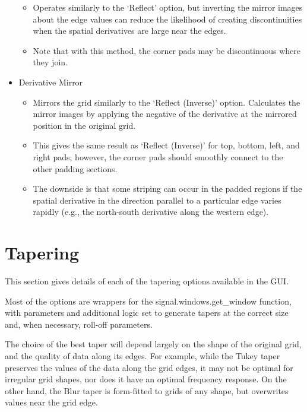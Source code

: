 \documentclass[letterpaper,10pt,english,openany,oneside]{sphinxmanual}
\begin{document}
\begin{itemize}
\begin{itemize}
\item {} 
Operates similarly to the ‘Reflect’ option, but inverting the mirror images about the edge values can reduce the likelihood of creating discontinuities when the spatial derivatives are large near the edges.

\item {} 
Note that with this method, the corner pads may be discontinuous where they join.

\end{itemize}

\item {} 
Derivative Mirror
\begin{itemize}
\item {} 
Mirrors the grid similarly to the ‘Reflect (Inverse)’ option. Calculates the mirror images by applying the negative of the derivative at the mirrored position in the original grid.

\item {} 
This gives the same result as ‘Reflect (Inverse)’ for top, bottom, left, and right pads; however, the corner pads should smoothly connect to the other padding sections.

\item {} 
The downside is that some striping can occur in the padded regions if the spatial derivative in the direction parallel to a particular edge varies rapidly (e.g., the north-south derivative along the western edge).

\end{itemize}

\end{itemize}


\section{Tapering}
\label{\detokenize{index:tapering}}\label{\detokenize{content/preprocessing/tapering:tapering}}
This section gives details of each of the tapering options available in the GUI.

Most of the options are wrappers for the signal.windows.get\_window function, with parameters and additional logic set to generate tapers at the correct size and, when necessary, roll-off parameters.

The choice of the best taper will depend largely on the shape of the original grid, and the quality of data along its edges. For example, while the Tukey taper preserves the values of the data along the grid edges, it may not be optimal for irregular grid shapes, nor does it have an optimal frequency response. On the other hand, the Blur taper is form-fitted to grids of any shape, but overwrites values near the grid edge.
\end{document}
